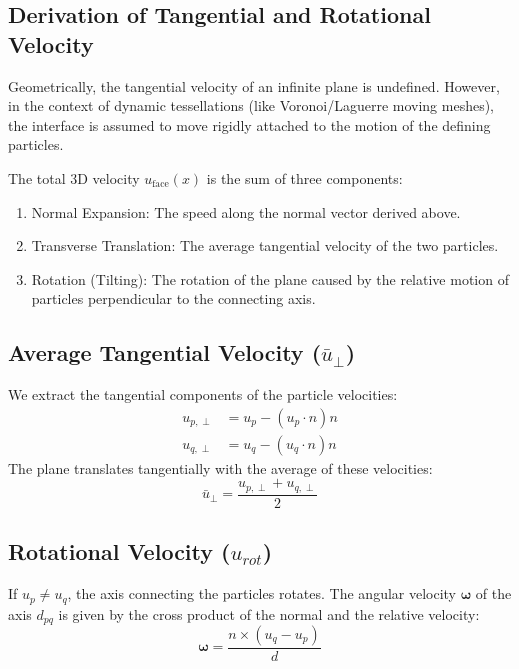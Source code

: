 \documentclass[twocolumn]{aastex63}
\begin{document}
\subsection{Derivation of Tangential and Rotational Velocity}

Geometrically, the tangential velocity of an infinite plane is undefined. However, in the context of dynamic tessellations (like Voronoi/Laguerre moving meshes), the interface is assumed to move rigidly attached to the motion of the defining particles.

The total 3D velocity $u_\textrm{face}({x})$ is the sum of three components:
\begin{enumerate}
    \item {Normal Expansion:} The speed along the normal vector derived above.
    \item {Transverse Translation:} The average tangential velocity of the two particles.
    \item {Rotation (Tilting):} The rotation of the plane caused by the relative motion of particles perpendicular to the connecting axis.
\end{enumerate}

\subsection{Average Tangential Velocity (${\bar{u}}_{\perp}$)}
We extract the tangential components of the particle velocities:
\begin{align}
    {u}_{p,\perp} &= {u}_p - ({u}_p \cdot {n}){n} \\
    {u}_{q,\perp} &= {u}_q - ({u}_q \cdot {n}){n}
\end{align}
The plane translates tangentially with the average of these velocities:
\begin{equation}
    {\bar{u}}_{\perp} = \frac{{u}_{p,\perp} + {u}_{q,\perp}}{2}
\end{equation}

\subsection{Rotational Velocity (${u}_{rot}$)}
If ${u}_p \neq {u}_q$, the axis connecting the particles rotates. The angular velocity $\boldsymbol{\omega}$ of the axis ${d}_{pq}$ is given by the cross product of the normal and the relative velocity:
\begin{equation}
    \boldsymbol{\omega} = \frac{{n} \times ({u}_q - {u}_p)}{d}
\end{equation}
\end{document}
